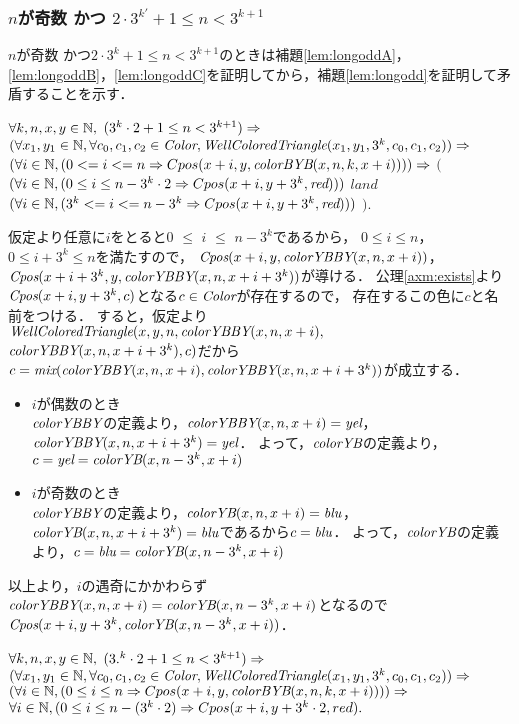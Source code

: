 \subsubsection{$n$が奇数 かつ $2 \cdot 3^{k'} + 1 \leq n < 3^{k+1}$}
$n$が奇数 かつ$2 \cdot 3^{k} + 1 \leq n < 3^{k+1}$のときは補題\ref{lem:longoddA}，\ref{lem:longoddB}，\ref{lem:longoddC}を証明してから，補題\ref{lem:longodd}を証明して矛盾することを示す．
\begin{lem}[\LongOddA] \label{lem:longoddA}
  $\forall k,n,x,y \in \mathbb{N},$
  $(3^k\cdot2 + 1 \leq n < 3^{k+1}) \Rightarrow$
  $(\forall x_1,y_1 \in \mathbb{N}, \forall c_0,c_1,c_2 \in \textit{Color}, \textit{WellColoredTriangle}(x_1,y_1,3^k,c_0,c_1,c_2)) \Rightarrow$
  $(\forall i \in \mathbb{N},(0 <= i <= n \Rightarrow Cpos(x+i,y,\textit{colorBYB}(x,n,k,x+i)))) \Rightarrow$ 
      $($
        $(\forall i \in \mathbb{N},(0 \leq i \leq n - 3^k\cdot2 \Rightarrow Cpos(x+i,y+3^k,\textit{red})))$
        $land$
        $(\forall i \in \mathbb{N},(3^k <= i <= n - 3^k \Rightarrow Cpos(x+i,y+3^k,\textit{red})))$
      $)$.
\end{lem}
仮定より任意に$i$をとると$0$ $\leq$ $i$ $\leq$ $n-3^k$であるから，
  $0 \leq i \leq n$，$0 \leq i+3^k \leq n$を満たすので，
  $\textit{Cpos}(x+i,y,\textit{colorYBBY}(x,n,x+i))$，$\textit{Cpos}(x+i+3^k,y,\textit{colorYBBY}(x,n,x+i+3^k))$が導ける．
  公理\ref{axm:exists}より$\textit{Cpos}(x+i,y+3^k,c)$となる$c\in\textit{Color}$が存在するので，
  存在するこの色に$c$と名前をつける．
  すると，仮定より$\textit{WellColoredTriangle}(x,y,n,\textit{colorYBBY}(x,n,x+i),$ $\textit{colorYBBY}(x,n,x+i+3^k),c)$だから$c=\textit{mix}(\textit{colorYBBY}(x,n,x+i),\textit{colorYBBY}(x,n,x+i+3^k))$が成立する．
  \begin{itemize}
  \item
    $i$が偶数のとき \\
    $\textit{colorYBBY}$の定義より，$\textit{colorYBBY}(x,n,x+i)=\textit{yel}$，$\textit{colorYBBY}(x,n,x+i+3^k)=\textit{yel}$．
    よって，$\textit{colorYB}$の定義より，$c=\textit{yel}=\textit{colorYB}(x,n-3^k,x+i)$
  \item
    $i$が奇数のとき \\
    $\textit{colorYBBY}$の定義より，$\textit{colorYB}(x,n,x+i)=\textit{blu}$，$\textit{colorYB}(x,n,x+i+3^k)=\textit{blu}$であるから$c=\textit{blu}$．
    よって，$\textit{colorYB}$の定義より，$c=\textit{blu}=\textit{colorYB}(x,n-3^k,x+i)$
  \end{itemize}
  以上より，$i$の遇奇にかかわらず$\textit{colorYBBY}(x,n,x+i)=\textit{colorYB}(x,n-3^k,x+i)$となるので$\textit{Cpos}(x+i,y+3^k,\textit{colorYB}(x,n-3^k,x+i))$．
\begin{lem}[\LongOddB] \label{lem:longoddB}
  $\forall k,n,x,y \in \mathbb{N},$
  $(3.^k\cdot2 + 1 \leq n < 3^{k+1}) \Rightarrow$
  $(\forall x_1,y_1 \in \mathbb{N}, \forall c_0,c_1,c_2 \in \textit{Color}, \textit{WellColoredTriangle}(x_1,y_1,3^k,c_0,c_1,c_2)) \Rightarrow$
  $(\forall i \in \mathbb{N},(0 \leq i \leq n \Rightarrow Cpos(x+i,y,\textit{colorBYB}(x,n,k,x+i)))) \Rightarrow$ 
  $\forall i \in \mathbb{N}, (0 \leq i \leq n-(3^k\cdot2) \Rightarrow Cpos(x+i,y+3^k\cdot2,red).$
\end{lem}
